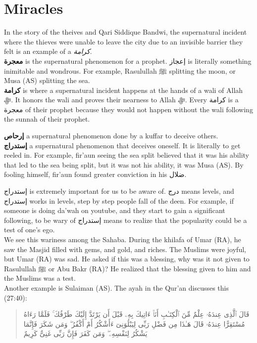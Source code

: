 \documentclass[]{book}
\begin{document}
\hypertarget{miracles}{%
\section{Miracles}\label{miracles}}

In the story of the theives and \protect\hypertarget{qari-siddique}{}{Qari Siddique Bandwi}, the supernatural incident where the thieves were unable to leave the city due to an invisible barrier they felt is an example of a \emph{كرامة}.\\
\textbf{معجرة} is the supernatural phenomenon for a prophet. إعجاز is literally something inimitable and wondrous. For example, Rasulullah ﷺ splitting the moon, or Musa (AS) splitting the sea.\\
\textbf{كرامة} is where a supernatural incident happens at the hands of a wali of Allah ﷻ. It honors the wali and proves their nearness to Allah ﷻ. Every كرامة is a معجرة of their prophet because they would not happen without the wali following the sunnah of their prophet.

\textbf{إرحاص} a supernatural phenomenon done by a kuffar to deceive others.\\
\textbf{إستدراج} a supernatural phenomenon that deceives oneself. It is literally to get reeled in. For example, fir'aun seeing the sea split believed that it was his ability that led to the sea being split, but it was not his ability, it was Musa (AS). By fooling himself, fir'aun found greater conviction in his ضلال.

إستدراج is extremely important for us to be aware of. درج means levels, and إستدراج works in levels, step by step people fall of the deen. For example, if someone is doing da'wah on youtube, and they start to gain a significant following, to be wary of إستدراج means to realize that the popularity could be a test of one's ego.\\
We see this wariness among the Sahaba. During the khilafa of Umar (RA), he saw the Masjid filled with gems, and gold, and riches. The Muslims were joyful, but Umar (RA) was sad. He asked if this was a blessing, why was it not given to Rasulullah ﷺ or Abu Bakr (RA)? He realized that the blessing given to him and the Muslims was a test.\\
Another example is Sulaiman (AS). The ayah in the Qur'an discusses this (27:40):

\begin{quote}
قَالَ ٱلَّذِى عِندَهُۥ عِلْمٌ مِّنَ ٱلْكِتَـٰبِ أَنَا۠ ءَاتِيكَ بِهِۦ قَبْلَ أَن يَرْتَدَّ إِلَيْكَ طَرْفُكَ ۚ فَلَمَّا رَءَاهُ مُسْتَقِرًّا عِندَهُۥ قَالَ هَـٰذَا مِن فَضْلِ رَبِّى لِيَبْلُوَنِىٓ ءَأَشْكُرُ أَمْ أَكْفُرُ ۖ وَمَن شَكَرَ فَإِنَّمَا يَشْكُرُ لِنَفْسِهِۦ ۖ وَمَن كَفَرَ فَإِنَّ رَبِّى غَنِىٌّ كَرِيمٌ
\end{quote}
\end{document}

